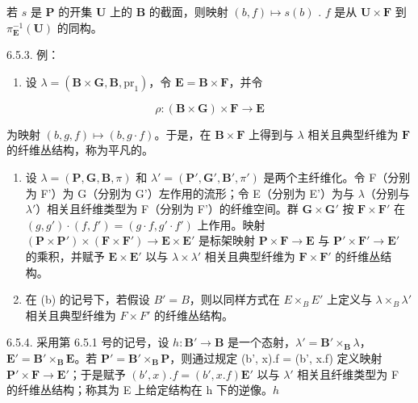 若 \(s\) 是 \(\mathbf{P}\) 的开集 \(\mathbf{U}\) 上的 \(\mathbf{B}\) 的截面，则映射 \((b, f) \mapsto s(b)\) . \(f\) 是从 \(\mathbf{U} \times \mathbf{F}\) 到 \(\pi_{\mathbf{E}}^{-1}(\mathbf{U})\) 的同构。

6.5.3. 例：

\begin{enumerate}
\def\labelenumi{(\alph{enumi})}
\tightlist
\item
  设 \(\lambda = (\mathbf{B} \times \mathbf{G}, \mathbf{B}, \mathrm{pr}_1)\)，令 \(\mathbf{E} = \mathbf{B} \times \mathbf{F}\)，并令
\end{enumerate}

\[
\rho : (\mathbf {B} \times \mathbf {G}) \times \mathbf {F} \rightarrow \mathbf {E}
\]

为映射 \((b, g, f) \mapsto (b, g \cdot f)\)。于是，在 \(\mathbf{B} \times \mathbf{F}\) 上得到与 \(\lambda\) 相关且典型纤维为 \(\mathbf{F}\) 的纤维丛结构，称为平凡的。

\begin{enumerate}
\def\labelenumi{(\alph{enumi})}
\setcounter{enumi}{1}
\item
  设 \(\lambda = (\mathbf{P},\mathbf{G},\mathbf{B},\pi)\) 和 \(\lambda' = (\mathbf{P}',\mathbf{G}',\mathbf{B}',\pi')\) 是两个主纤维化。令 F（分别为 F'）为 G（分别为 G'）左作用的流形；令 E（分别为 E'）为与 \(\lambda\)（分别与 \(\lambda'\)）相关且纤维类型为 F（分别为 F'）的纤维空间。群 \(\mathbf{G} \times \mathbf{G}'\) 按 \(\mathbf{F} \times \mathbf{F}'\) 在 \((g, g') \cdot (f, f') = (g \cdot f, g' \cdot f')\) 上作用。映射 \((\mathbf{P} \times \mathbf{P}') \times (\mathbf{F} \times \mathbf{F}') \to \mathbf{E} \times \mathbf{E}'\) 是标架映射 \(\mathbf{P} \times \mathbf{F} \to \mathbf{E}\) 与 \(\mathbf{P}' \times \mathbf{F}' \to \mathbf{E}'\) 的乘积，并赋予 \(\mathbf{E} \times \mathbf{E}'\) 以与 \(\lambda \times \lambda'\) 相关且典型纤维为 \(\mathbf{F} \times \mathbf{F}'\) 的纤维丛结构。
\item
  在 (b) 的记号下，若假设 \(B' = B\)，则以同样方式在 \(E \times_{B} E'\) 上定义与 \(\lambda \times_{B} \lambda'\) 相关且典型纤维为 \(F \times F'\) 的纤维丛结构。
\end{enumerate}

6.5.4. 采用第 6.5.1 号的记号，设 \(h: \mathbf{B}' \to \mathbf{B}\) 是一个态射，\(\lambda' = \mathbf{B}' \times_{\mathbf{B}} \lambda\)，\(\mathbf{E}' = \mathbf{B}' \times_{\mathbf{B}} \mathbf{E}\)。若 \(\mathbf{P}' = \mathbf{B}' \times_{\mathbf{B}} \mathbf{P}\)，则通过规定 (b', x).f = (b', x.f) 定义映射 \(\mathbf{P}' \times \mathbf{F} \to \mathbf{E}'\)；于是赋予 \((b', x).f = (b', x.f)\)\(\mathbf{E}'\) 以与 \(\lambda'\) 相关且纤维类型为 F 的纤维丛结构；称其为 E 上给定结构在 h 下的逆像。\(h\)

